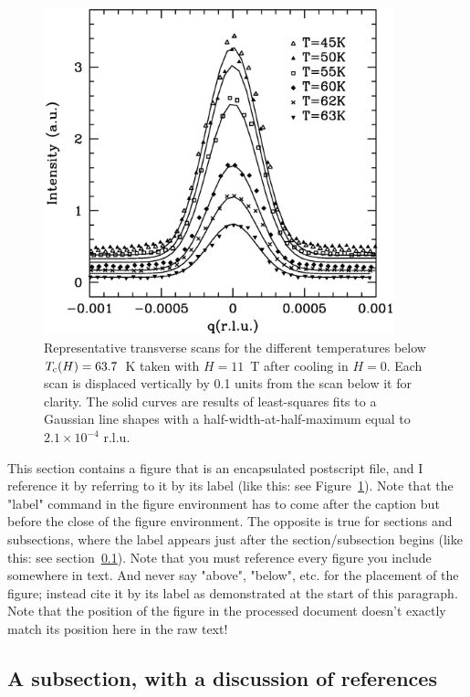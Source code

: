 \documentclass[11pt]{ucscthesisbs}
\begin{document}
\begin{figure}[t!]
 \centerline{
  \includegraphics[width=4.0in]{comparezfc_bw.eps}
 }
\caption[Transverse Scans at difference Temperatures at $H=11$~T]
{Representative transverse scans for the different temperatures
below $T_{\rm c}(H) = 63.7$~K taken with
$H=11$~T after cooling in $H=0$. Each scan is displaced vertically by 0.1 units
from the scan below it for clarity.  The solid curves
are results of least-squares fits to
a Gaussian line shapes with a half-width-at-half-maximum
equal to $2.1\times10^{-4}$ r.l.u.  
}
\label{fig:discretescan}
\end{figure}

This section contains a figure that is an encapsulated postscript file, and I reference it by referring to it by its label (like this: see Figure~\ref{fig:discretescan}).  Note that the "label" command in the figure environment has to come after the caption but before the close of the figure environment.  The opposite is true for sections and subsections, where the label appears just after the section/subsection begins (like this: see section~\ref{subsection_example}).  Note that you must reference every figure you include somewhere in text.  And never say "above", "below", etc. for the placement of the figure; instead cite it by its label as demonstrated at the start of this paragraph.  Note that the position of the figure in the processed document doesn't exactly match its position here in the raw text!

\subsection{A subsection, with a discussion of references}\label{subsection_example}
\end{document}
